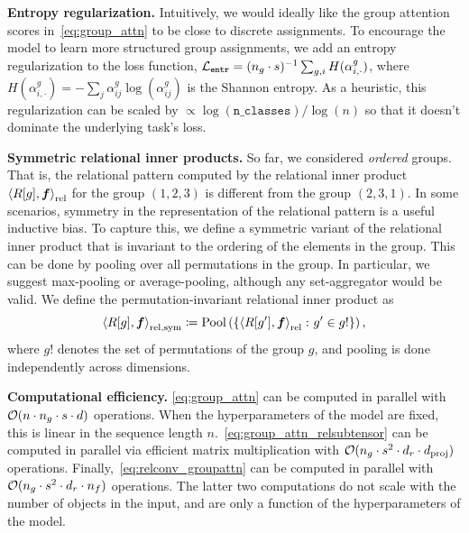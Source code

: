 \textbf{Entropy regularization.} Intuitively, we would ideally like the group attention scores in~\cref{eq:group_attn} to be close to discrete assignments. 
To encourage the model to learn more structured group assignments, we add an entropy regularization to the loss function, ${\mathcal{L}}_{\mathtt{entr}} = (n_g \cdot s)^{-1} \sum_{g, i} H(\alpha_{i,\cdot}^{g})$, where $H(\alpha_{i,\cdot}^{g}) = - \sum_{j} \alpha_{ij}^{g} \log(\alpha_{ij}^g)$ is the Shannon entropy. As a heuristic, this regularization can be scaled by $\propto \log(\mathtt{n\_classes}) / \log(n)$ so that it doesn't dominate the underlying task's loss.

\textbf{Symmetric relational inner products.} So far, we considered \textit{ordered} groups. That is, the relational pattern computed by the relational inner product $\left\langle R[g], \bm{f} \right\rangle_\mathrm{rel}$ for the group $(1, 2, 3)$ is different from the group $(2, 3, 1)$. In some scenarios, symmetry in the representation of the relational pattern is a useful inductive bias. To capture this, we define a symmetric variant of the relational inner product that is invariant to the ordering of the elements in the group. This can be done by pooling over all permutations in the group. In particular, we suggest max-pooling or average-pooling, although any set-aggregator would be valid. We define the permutation-invariant relational inner product as
\begin{equation}\label{eq:symmetric_relational_inner_prod}
    \left \langle R[g], \bm{f} \right\rangle_{\mathrm{rel}, \mathrm{sym}} \coloneq \mathrm{Pool}\left(\left\{\left\langle R[g'], \bm{f} \right\rangle_\mathrm{rel} \colon g' \in g!\right\}\right),
\end{equation}
where $g!$ denotes the set of permutations of the group $g$, and pooling is done independently across dimensions.


\textbf{Computational efficiency.} \cref{eq:group_attn} can be computed in parallel with ${\mathcal{O}}(n \cdot n_g \cdot s \cdot d)$ operations. When the hyperparameters of the model are fixed, this is linear in the sequence length $n$.~\cref{eq:group_attn_relsubtensor} can be computed in parallel via efficient matrix multiplication with ${\mathcal{O}}(n_g \cdot s^2 \cdot d_r \cdot d_{\mathrm{proj}})$ operations. Finally,~\cref{eq:relconv_groupattn} can be computed in parallel with ${\mathcal{O}}(n_g \cdot s^2 \cdot d_r \cdot n_f)$ operations. The latter two computations do not scale with the number of objects in the input, and are only a function of the hyperparameters of the model.
